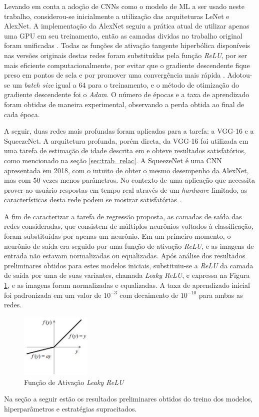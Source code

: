 Levando em conta a adoção de CNNs como o modelo de ML a ser usado neste trabalho, considerou-se inicialmente a utilização das arquiteturas LeNet e AlexNet. A implementação da AlexNet seguiu a prática atual de utilizar apenas uma GPU em seu treinamento, então as camadas dividas no trabalho original foram unificadas \cite{tensorflow:alexnet}. Todas as funções de ativação tangente hiperbólica disponíveis nas versões originais destas redes foram substituídas pela função \emph{ReLU}, por ser mais eficiente computacionalmente, por evitar que o gradiente descendente fique preso em pontos de sela e por promover uma convergência mais rápida \cite{maas2013rectifier}. Adotou-se um \emph{batch size} igual a $64$ para o treinamento, e o método de otimização do gradiente descendente foi o \emph{Adam}. O número de épocas e a taxa de aprendizado foram obtidas de maneira experimental, observando a perda obtida ao final de cada época.

A seguir, duas redes mais profundas foram aplicadas para a tarefa: a VGG-16 e a SqueezeNet. A arquitetura profunda, porém direta, da VGG-16 foi utilizada em uma tarefa de estimação de idade descrita em \cite{rothe2015dex} e obteve resultados satisfatórios, como mencionado na seção \ref{sec:trab_relac}. A SqueezeNet é uma CNN apresentada em 2018, com o intuito de obter o mesmo desempenho da AlexNet, mas com 50 vezes menos parâmetros. No contexto de uma aplicação que necessita prover ao usuário respostas em tempo real através de um \emph{hardware} limitado, as características desta rede podem se mostrar satisfatórias \cite{squeezenet}.

A fim de caracterizar a tarefa de regressão proposta, as camadas de saída das redes consideradas, que consistem de múltiplos neurônios voltados à classificação, foram substituídas por apenas um neurônio. Em um primeiro momento, o neurônio de saída era seguido por uma função de ativação \emph{ReLU}, e as imagens de entrada não estavam normalizadas ou equalizadas. Após análise dos resultados preliminares obtidos para estes modelos iniciais, substituiu-se a \emph{ReLU} da camada de saída por uma de suas variantes, chamada \emph{Leaky ReLU}, e expressa na Figura \ref{fig:lrelu}, e as imagens foram normalizadas e equalizadas. A taxa de aprendizado inicial foi padronizada em um valor de $10^{-3}$ com decaimento de $10^{-10}$ para ambas as redes.

\begin{figure}[!ht]
     \centering
     \includegraphics[width=0.3\textwidth]{img/lrelu}
     \caption{Função de Ativação \emph{Leaky ReLU}}
     \label{fig:lrelu}
\end{figure}

Na seção a seguir estão os resultados preliminares obtidos do treino dos modelos, hiperparâmetros e estratégias supracitados.
